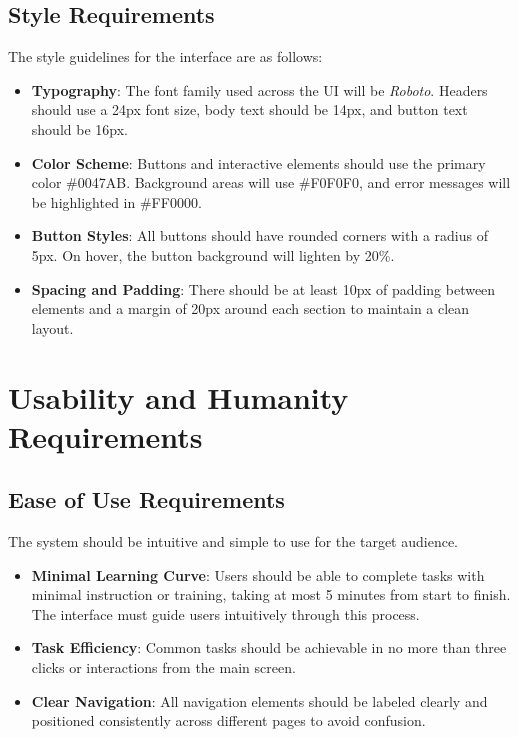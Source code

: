 \documentclass[12pt]{article}
\begin{document}
\subsection{Style Requirements}
The style guidelines for the interface are as follows:
\begin{itemize}
    \item \textbf{Typography}: The font family used across the UI will be 
    \textit{Roboto}. Headers should use a 24px font size, body text should be 
    14px, and button text should be 16px.
    
    \item \textbf{Color Scheme}: Buttons and interactive elements should use the 
    primary color \#0047AB. Background areas will use \#F0F0F0, and error 
    messages will be highlighted in \#FF0000.
    
    \item \textbf{Button Styles}: All buttons should have rounded corners with 
    a radius of 5px. On hover, the button background will lighten by 20\%.
    
    \item \textbf{Spacing and Padding}: There should be at least 10px of padding 
    between elements and a margin of 20px around each section to maintain a clean 
    layout.
\end{itemize}


\section{Usability and Humanity Requirements}

\subsection{Ease of Use Requirements}
The system should be intuitive and simple to use for the target audience.
\begin{itemize}
    \item \textbf{Minimal Learning Curve}: Users should be able to complete tasks 
    with minimal instruction or training, taking at most 5 minutes from start 
    to finish. The interface must guide users intuitively through this process.
    
    \item \textbf{Task Efficiency}: Common tasks should be achievable in no more 
    than three clicks or interactions from the main screen.
    
    \item \textbf{Clear Navigation}: All navigation elements should be labeled 
    clearly and positioned consistently across different pages to avoid confusion.
\end{itemize}
\end{document}
